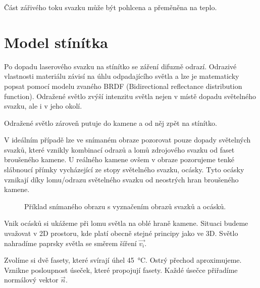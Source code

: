 Část zářivého toku svazku může být pohlcena a přeměněna na teplo.

\section{Model stínítka}
\label{sec:stinitko}
Po dopadu laserového svazku na stínítko se záření difuzně odrazí. Odrazivé vlastnosti materiálu závisí na úhlu odpadajícího světla a lze je matematicky popsat pomocí modelu zvaného BRDF (Bidirectional reflectance distribution function). Odražené světlo zvýší intenzitu světla nejen v místě dopadu světelného svazku, ale i v jeho okolí.

Odražené světlo zároveň putuje do kamene a od něj zpět na stínítko. 




V ideálním případě lze ve snímaném obraze pozorovat pouze dopady světelných svazků, které vznikly kombinací odrazů a lomů zdrojového svazku od faset broušeného kamene. U reálného kamene ovšem v obraze pozorujeme tenké slábnoucí přímky vycházející ze stopy světelného svazku, ocásky. Tyto ocásky vznikají díky lomu/odrazu světelného svazku od neostrých hran broušeného kamene.

\begin{figure}[h!]
\begin{center}
\scalebox{.9}{ }
\end{center}
\caption{Příklad snímaného obrazu s vyznačením obrazů svazků a ocásků.}
\label{fig:tail_ex1}
\end{figure}


Vnik ocásků si ukážeme při lomu světla na oblé hraně kamene. Situaci budeme uvažovat v 2D prostoru, kde platí obecně stejné principy jako ve 3D. Světlo nahradíme paprsky světla se směrem šíření $\vec{v_i}$. 

Zvolíme si dvě fasety, které svírají úhel \SI{45}{\celsius}. Ostrý přechod aproximujeme. Vznikne posloupnost úseček, které propojují fasety. Každé úsečce přiřadíme normálový vektor $\vec{n}$.  

